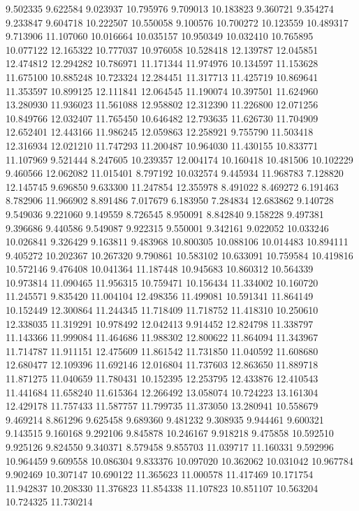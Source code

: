 9.502335
9.622584
9.023937
10.795976
9.709013
10.183823
9.360721
9.354274
9.233847
9.604718
10.222507
10.550058
9.100576
10.700272
10.123559
10.489317
9.713906
11.107060
10.016664
10.035157
10.950349
10.032410
10.765895
10.077122
12.165322
10.777037
10.976058
10.528418
12.139787
12.045851
12.474812
12.294282
10.786971
11.171344
11.974976
10.134597
11.153628
11.675100
10.885248
10.723324
12.284451
11.317713
11.425719
10.869641
11.353597
10.899125
12.111841
12.064545
11.190074
10.397501
11.624960
13.280930
11.936023
11.561088
12.958802
12.312390
11.226800
12.071256
10.849766
12.032407
11.765450
10.646482
12.793635
11.626730
11.704909
12.652401
12.443166
11.986245
12.059863
12.258921
9.755790
11.503418
12.316934
12.021210
11.747293
11.200487
10.964030
11.430155
10.833771
11.107969
9.521444
8.247605
10.239357
12.004174
10.160418
10.481506
10.102229
9.460566
12.062082
11.015401
8.797192
10.032574
9.445934
11.968783
7.128820
12.145745
9.696850
9.633300
11.247854
12.355978
8.491022
8.469272
6.191463
8.782906
11.966902
8.891486
7.017679
6.183950
7.284834
12.683862
9.140728
9.549036
9.221060
9.149559
8.726545
8.950091
8.842840
9.158228
9.497381
9.396686
9.440586
9.549087
9.922315
9.550001
9.342161
9.022052
10.033246
10.026841
9.326429
9.163811
9.483968
10.800305
10.088106
10.014483
10.894111
9.405272
10.202367
10.267320
9.790861
10.583102
10.633091
10.759584
10.419816
10.572146
9.476408
10.041364
11.187448
10.945683
10.860312
10.564339
10.973814
11.090465
11.956315
10.759471
10.156434
11.334002
10.160720
11.245571
9.835420
11.004104
12.498356
11.499081
10.591341
11.864149
10.152449
12.300864
11.244345
11.718409
11.718752
11.418310
10.250610
12.338035
11.319291
10.978492
12.042413
9.914452
12.824798
11.338797
11.143366
11.999084
11.464686
11.988302
12.800622
11.864094
11.343967
11.714787
11.911151
12.475609
11.861542
11.731850
11.040592
11.608680
12.680477
12.109396
11.692146
12.016804
11.737603
12.863650
11.889718
11.871275
11.040659
11.780431
10.152395
12.253795
12.433876
12.410543
11.441684
11.658240
11.615364
12.266492
13.058074
10.724223
13.161304
12.429178
11.757433
11.587757
11.799735
11.373050
13.280941
10.558679
9.469214
8.861296
9.625458
9.689360
9.481232
9.308935
9.944461
9.600321
9.143515
9.160168
9.292106
9.845878
10.246167
9.918218
9.475858
10.592510
9.925126
9.824550
9.340371
8.579458
9.855703
11.039717
11.160331
9.592996
10.964459
9.609558
10.086304
9.833376
10.097020
10.362062
10.031042
10.967784
9.902469
10.307147
10.690122
11.365623
11.000578
11.417469
10.171754
11.942837
10.208330
11.376823
11.854338
11.107823
10.851107
10.563204
10.724325
11.730214
